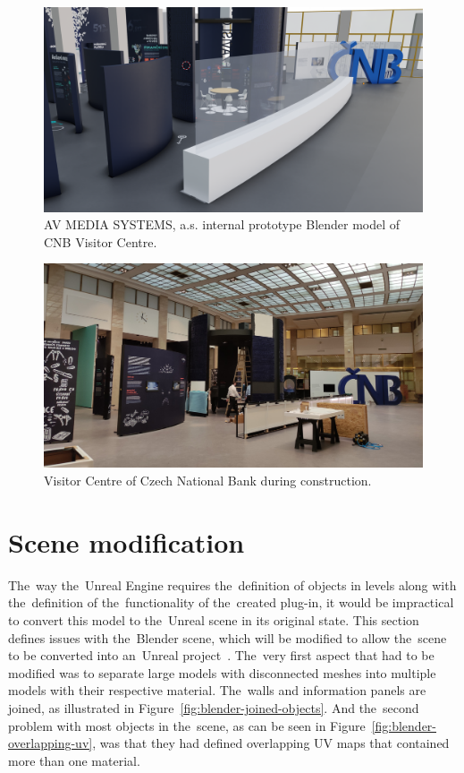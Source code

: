 \begin{figure}[!ht]\centering
    \includegraphics[width=\textwidth]{img/blender-cnb-scene.png}
    \caption[AV MEDIA SYSTEMS, a.s. internal prototype Blender model of CNB Visitor Centre.]{AV MEDIA SYSTEMS, a.s. internal prototype Blender model of CNB Visitor Centre.~\cite{cnb3dmodel}}
    \label{fig:blender-cnb-level}
\end{figure}

\begin{figure}[!ht]\centering
    \includegraphics[width=\textwidth]{img/real-cnb-scene.jpg}
    \caption{Visitor Centre of Czech National Bank during construction.}
    \label{fig:real-cnb-level}
\end{figure}

\section{Scene modification}
The~way the~Unreal Engine requires the~definition of objects in levels along with the~definition of the~functionality of the~created plug-in, it would be impractical to convert this model to the~Unreal scene in its original state. This section defines issues with the~Blender scene, which will be modified to allow the~scene to be converted into an~Unreal project~\cite{blender-doc}. The~very first aspect that had to be modified was to separate large models with disconnected meshes into multiple models with their respective material. The~walls and information panels are joined, as illustrated in Figure~\ref{fig:blender-joined-objects}. And the~second problem with most objects in the~scene, as can be seen in Figure~\ref{fig:blender-overlapping-uv}, was that they had defined overlapping UV maps that contained more than one material. 

